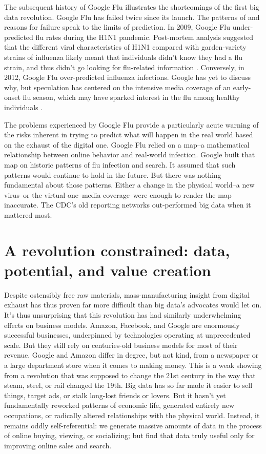 \documentclass[12pt]{article}
\begin{document}
The subsequent history of Google Flu illustrates the shortcomings of
the first big data revolution. Google Flu has failed twice since its
launch. The patterns of and reasons for failure speak to the limits of
prediction. In 2009, Google Flu under-predicted flu rates during the
H1N1 pandemic. Post-mortem analysis suggested that the different viral
characteristics of H1N1 compared with garden-variety strains of
influenza likely meant that individuals didn't know they had a flu
strain, and thus didn't go looking for flu-related information
\citep{cook2011assessing}. Conversely, in 2012, Google Flu
over-predicted influenza infections. Google has yet to discuss why,
but speculation has centered on the intensive media coverage of an
early-onset flu season, which may have sparked interest in the flu among
healthy individuals \citep{butler2013google}.

The problems experienced by Google Flu provide a particularly acute
warning of the risks inherent in trying to predict what will happen in
the real world based on the exhaust of the digital one. Google Flu
relied on a map--a mathematical relationship between online behavior
and real-world infection. Google built that map on historic patterns
of flu infection and search. It assumed that such patterns would
continue to hold in the future. But there was nothing fundamental
about those patterns. Either a change in
the physical world--a new virus--or the virtual one--media
coverage--were enough to render the map inaccurate. The CDC's old
reporting networks out-performed big data when it mattered most.



\section{A revolution constrained: data, potential, and value creation}
\label{sec:but-what-can}

Despite ostensibly free raw materials, mass-manufacturing insight from
digital exhaust has thus proven far more difficult than big data's
advocates would let on. It's thus unsurprising that this revolution
has had similarly underwhelming effects on business models. Amazon,
Facebook, and Google are enormously successful businesses, underpinned
by technologies operating at unprecedented scale. But they still rely
on centuries-old business models for most of their revenue. Google and
Amazon differ in degree, but not kind, from a newspaper or a large
department store when it comes to making money. This is a weak showing
from a revolution that was supposed to change the 21st century in the
way that steam, steel, or rail changed the 19th. Big data has so far
made it easier to sell things, target ads, or stalk long-lost friends
or lovers. But it hasn't yet fundamentally reworked patterns of
economic life, generated entirely new occupations, or radically
altered relationships with the physical world. Instead, it remains
oddly self-referential: we generate massive amounts of data in the
process of online buying, viewing, or socializing; but find that data
truly useful only for improving online sales and search.
\end{document}
